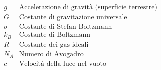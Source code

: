\begin{align*}
    &g      & \text{Accelerazione di gravità (superficie terrestre)}\\
    &G      & \text{Costante di gravitazione universale}\\
    &\sigma & \text{Costante di Stefan-Boltzmann}\\
    &k_B    & \text{Costante di Boltzmann}\\
    &R      & \text{Costante dei gas ideali}\\
    &N_A    & \text{Numero di Avogadro}\\
    &c      & \text{Velocità della luce nel vuoto}
\end{align*}